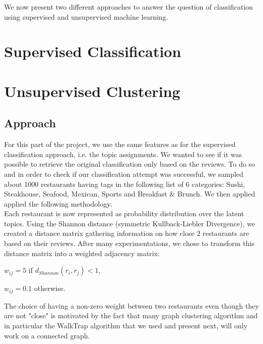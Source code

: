 \documentclass[twoside]{article}
\begin{document}
\begin{multicols}{2}
We now present two different approaches to answer the question of classification using supervised and unsupervised machine learning.\\

\section{Supervised Classification}

\section{Unsupervised Clustering}
\subsection{Approach}

For this part of the project, we use the same features as for the supervised classification approach, i.e. the topic assignments. We wanted to see if it was possible to retrieve the original classification only based on the reviews. To do so and in order to check if our classification attempt was successful, we sampled about 1000 restaurants having tags in the following list of 6 categories: Sushi, Steakhouse, Seafood, Mexican, Sports and Breakfast \& Brunch. We then applied applied the following methodology.\\

Each restaurant is now represented as probability distribution over the latent topics. Using the Shannon distance (symmetric Kullback-Liebler Divergence), we created a distance matrix gathering information on how close 2 restaurants are based on their reviews. After many experimentations, we chose to transform this distance matrix into a weighted adjacency matrix:\\

\begin{compactitem}
\item $w_{ij} = 5$ if $d_{Shannon}(r_i,r_j)<1$,
\item $w_{ij} = 0.1$ otherwise.\\
\end{compactitem}

\noindent The choice of having a non-zero weight between two restaurants even though they are not "close" is motivated by the fact that many graph clustering algorithm and in particular the WalkTrap algorithm that we used and present next, will only work on a connected graph.\\


\end{multicols}
\end{document}
